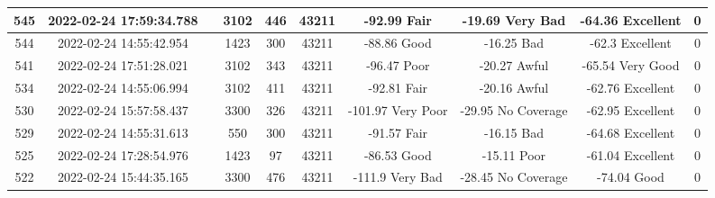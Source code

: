 \begin{longtable*}{|c|c|c|c|c|c|c|c|c|c|}
545&2022-02-24 17:59:34.788&&3102&446&43211& -92.99    Fair        & -19.69    Very Bad    & -64.36    Excellent   & 0\\\hline
{}544&2022-02-24 14:55:42.954&&1423&300&43211& -88.86    Good        & -16.25    Bad         & -62.3     Excellent   & 0\\\hline
{}541&2022-02-24 17:51:28.021&&3102&343&43211& -96.47    Poor        & -20.27    Awful       & -65.54    Very Good   & 0\\\hline
{}534&2022-02-24 14:55:06.994&&3102&411&43211& -92.81    Fair        & -20.16    Awful       & -62.76    Excellent   & 0\\\hline
{}530&2022-02-24 15:57:58.437&&3300&326&43211& -101.97   Very Poor   & -29.95    No Coverage & -62.95    Excellent   & 0\\\hline
{}529&2022-02-24 14:55:31.613&&550&300&43211& -91.57    Fair        & -16.15    Bad         & -64.68    Excellent   & 0\\\hline
{}525&2022-02-24 17:28:54.976&&1423&97&43211& -86.53    Good        & -15.11    Poor        & -61.04    Excellent   & 0\\\hline
{}522&2022-02-24 15:44:35.165&&3300&476&43211& -111.9    Very Bad    & -28.45    No Coverage & -74.04    Good        & 0\\\hline

\end{longtable*}
